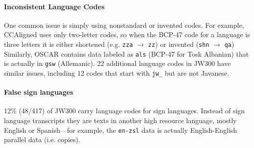 \paragraph{Inconsistent Language Codes} One common issue is simply using nonstandard or invented codes. For example, CCAligned uses only two-letter codes, so when the BCP-47 code for a language is three letters it is either shortened (e.g. \texttt{zza} $\rightarrow$ \texttt{zz})
or invented (\texttt{shn}  $\rightarrow$ \texttt{qa})
Similarly, OSCAR contains data labeled as \texttt{als} (BCP-47 for Tosk Albanian) that is actually in \texttt{gsw} (Allemanic).
22 additional language codes in JW300 have similar issues,
including 12 codes that start with \texttt{jw\_} but are not %
Javanese.


\paragraph{False sign languages}
12\% (48/417) of JW300
carry language codes for sign languages. %
Instead of sign language transcripts they are texts in another high resource language, mostly English or Spanish---for example, the \texttt{en-zsl} data is actually English-English parallel data (i.e. copies). %



